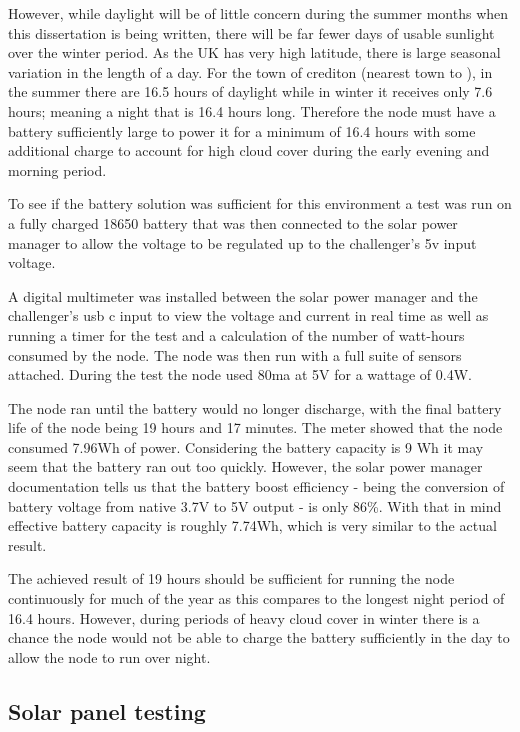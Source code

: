 However, while daylight will be of little concern during the summer months when
this dissertation is being written, there will be far fewer days of usable
sunlight over the winter period. As the UK has very high latitude, there is
large seasonal variation in the length of a day. For the town of crediton
(nearest town to \farmName), in the summer there are 16.5 hours of daylight
while in winter it receives only 7.6 hours; meaning a night that is 16.4 hours
long. Therefore the node must have a battery sufficiently large to power it for
a minimum of 16.4 hours with some additional charge to account for high cloud
cover during the early evening and morning period.

To see if the battery solution was sufficient for this environment a test was
run on a fully charged 18650 battery that was then connected to the solar power
manager to allow the voltage to be regulated up to the challenger's 5v input
voltage.

A digital multimeter was installed between the solar power manager and the
challenger's usb c input to view the voltage and current in real time as well as
running a timer for the test and a calculation of the number of watt-hours
consumed by the node. The node was then run with a full suite of sensors
attached. During the test the node used 80ma at 5V for a wattage of 0.4W.

The node ran until the battery would no longer discharge, with the final battery
life of the node being 19 hours and 17 minutes. The meter showed that the node
consumed 7.96Wh of power. Considering the battery capacity is 9 Wh it may seem
that the battery ran out too quickly. However, the solar power manager
documentation tells us that the battery boost efficiency - being the conversion
of battery voltage from native 3.7V to 5V output - is only 86\%. With that in
mind effective battery capacity is roughly 7.74Wh, which is very similar to the
actual result.

The achieved result of 19 hours should be sufficient for running the node
continuously for much of the year as this compares to the longest night period
of 16.4 hours. However, during periods of heavy cloud cover in winter there is a
chance the node would not be able to charge the battery sufficiently in the day
to allow the node to run over night.

\subsection{Solar panel testing}


